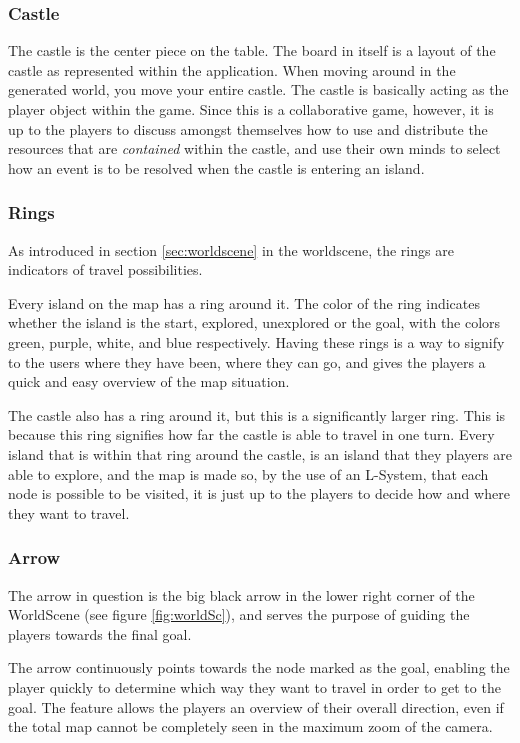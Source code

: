 \subsubsection{Castle}
The castle is the center piece on the table. The board in itself is a layout of the castle as represented within the application.
When moving around in the generated world, you move your entire castle. The castle is basically acting as the player object within the game. Since this is a collaborative game, however, it is up to the players to discuss amongst themselves how to use and distribute the resources that are \textit{contained} within the castle, and use their own minds to select how an event is to be resolved when the castle is entering an island.

\subsubsection{Rings}
As introduced in section \ref{sec:worldscene} in the worldscene, the rings are indicators of travel possibilities.

Every island on the map has a ring around it. The color of the ring indicates whether the island is the start, explored, unexplored or the goal, with the colors green, purple, white, and blue respectively. Having these rings is a way to signify to the users where they have been, where they can go, and gives the players a quick and easy overview of the map situation.

The castle also has a ring around it, but this is a significantly larger ring. This is because this ring signifies how far the castle is able to travel in one turn. Every island that is within that ring around the castle, is an island that they players are able to explore, and the map is made so, by the use of an L-System, that each node is possible to be visited, it is just up to the players to decide how and where they want to travel.

\subsubsection{Arrow}
The arrow in question is the big black arrow in the lower right corner of the WorldScene (see figure \ref{fig:worldSc}), and serves the purpose of guiding the players towards the final goal.

The arrow continuously points towards the node marked as the goal, enabling the player quickly to determine which way they want to travel in order to get to the goal. 
The feature allows the players an overview of their overall direction, even if the total map cannot be completely seen in the maximum zoom of the camera. 

